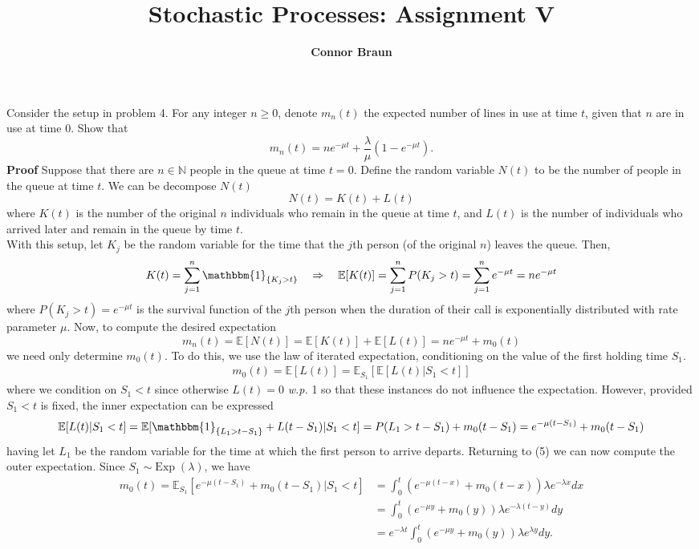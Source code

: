 \documentclass[11pt, letterpaper]{article}
\title{\bf Stochastic Processes: Assignment V}
\author{\bf Connor Braun}
\date{}
\newcommand{\mbb}[1]{\mathbb{#1}}
\begin{document}
    \maketitle
     Consider the setup in problem 4. For any integer $n\geq 0$, denote $m_n(t)$ the expected number of lines in use at time $t$, given that $n$
    are in use at time $0$. Show that
    \[m_n(t)=ne^{-\mu t}+\frac{\lambda}{\mu}(1-e^{-\mu t}).\]
    {\bf Proof} Suppose that there are $n\in\mbb{N}$ people in the queue at time $t=0$. Define the random variable $N(t)$ to be the number of people in the queue at time $t$.
    We can be decompose $N(t)$
    \[N(t)=K(t)+L(t)\]
    where $K(t)$ is the number of the original $n$ individuals who remain in the queue at time $t$, and $L(t)$ is the number of individuals
    who arrived later and remain in the queue by time $t$.\\[10pt]
    With this setup, let $K_j$ be the random variable for the time that the $j$th person (of the original $n$) leaves the queue. Then,
    \[K(t)=\sum_{j=1}^n\mathbbm{1}_{\{K_j>t\}}\quad\Rightarrow\quad\mbb{E}[K(t)]=\sum_{j=1}^nP(K_j>t)=\sum_{j=1}^ne^{-\mu t}=ne^{-\mu t}\]
    where $P(K_j>t)=e^{-\mu t}$ is the survival function of the $j$th person when the duration of their call is exponentially distributed with rate parameter $\mu$. Now, to compute the desired expectation
    \[m_n(t)=\mbb{E}[N(t)]=\mbb{E}[K(t)]+\mbb{E}[L(t)]=ne^{-\mu t}+m_0(t)\]
    we need only determine $m_0(t)$. To do this, we use the law of iterated expectation, conditioning on the value of the first holding time $S_1$.
    \begin{align*}
        m_0(t)=\mbb{E}[L(t)]=\mbb{E}_{S_1}[\mbb{E}[L(t)|S_1<t]]\tag{5}
    \end{align*}
    where we condition on $S_1<t$ since otherwise $L(t)=0$ {\it w.p.} 1 so that these instances do not influence the expectation. However, provided $S_1<t$ is fixed, the inner expectation can be expressed
    \[\mbb{E}[L(t)|S_1<t]=\mbb{E}[\mathbbm{1}_{\{L_1>t-S_1\}}+L(t-S_1)|S_1<t]=P(L_1>t-S_1)+m_0(t-S_1)=e^{-\mu(t-S_1)}+m_0(t-S_1)\]
    having let $L_1$ be the random variable for the time at which the first person to arrive departs. Returning to (5) we can now compute the outer expectation. Since $S_1\sim\text{Exp}\;(\lambda)$, we have
    \begin{align*}
        m_0(t)=\mbb{E}_{S_1}[e^{-\mu(t-S_1)}+m_0(t-S_1)|S_1<t]&=\int_{0}^t\left(e^{-\mu(t-x)}+m_0(t-x)\right)\lambda e^{-\lambda x}dx\\
        &=\int_0^t\left(e^{-\mu y}+m_0(y)\right)\lambda e^{-\lambda(t-y)}dy\tag{substituting $y=t-x$}\\
        &=e^{-\lambda t}\int_0^t\left(e^{-\mu y}+m_0(y)\right)\lambda e^{\lambda y}dy.
    \end{align*}
\end{document}
